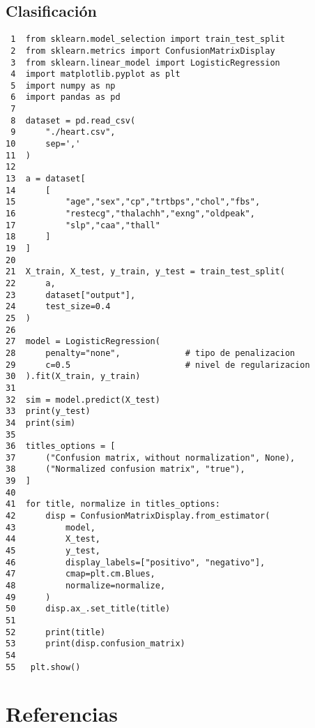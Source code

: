 \documentclass[11pt]{article}
\begin{document}
\subsection{Clasificación}
\label{sec:org5f6f495}
\begin{verbatim}
 1  from sklearn.model_selection import train_test_split     
 2  from sklearn.metrics import ConfusionMatrixDisplay
 3  from sklearn.linear_model import LogisticRegression
 4  import matplotlib.pyplot as plt
 5  import numpy as np
 6  import pandas as pd
 7  
 8  dataset = pd.read_csv(
 9      "./heart.csv", 
10      sep=','
11  )
12  
13  a = dataset[
14      [
15          "age","sex","cp","trtbps","chol","fbs",
16          "restecg","thalachh","exng","oldpeak",
17          "slp","caa","thall"
18      ]
19  ]
20  
21  X_train, X_test, y_train, y_test = train_test_split(
22      a,
23      dataset["output"],
24      test_size=0.4
25  )
26  
27  model = LogisticRegression(
28      penalty="none",             # tipo de penalizacion 
29      c=0.5                       # nivel de regularizacion 
30  ).fit(X_train, y_train)
31  
32  sim = model.predict(X_test)
33  print(y_test)
34  print(sim)
35  
36  titles_options = [
37      ("Confusion matrix, without normalization", None),
38      ("Normalized confusion matrix", "true"),
39  ]
40  
41  for title, normalize in titles_options:
42      disp = ConfusionMatrixDisplay.from_estimator(
43          model,
44          X_test,
45          y_test,
46          display_labels=["positivo", "negativo"],
47          cmap=plt.cm.Blues,
48          normalize=normalize,
49      )
50      disp.ax_.set_title(title)
51  
52      print(title)
53      print(disp.confusion_matrix)
54  
55   plt.show()
\end{verbatim}

\section{Referencias}
\label{sec:org14ddfef}
\printbibliography[heading=none]
\end{document}
